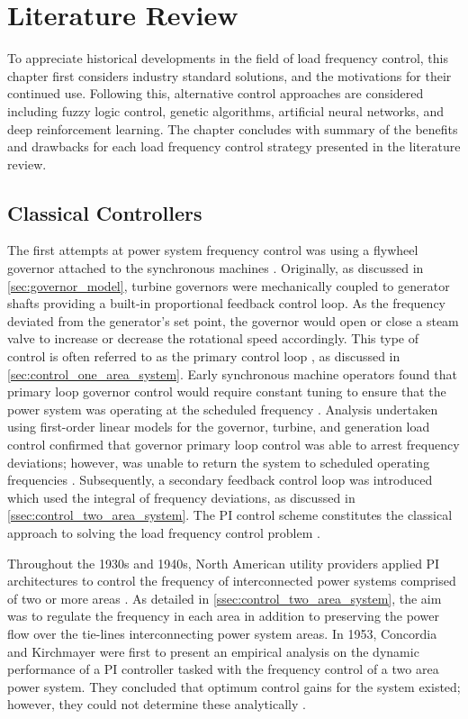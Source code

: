 \chapter{Literature Review}
To appreciate historical developments in the field of load frequency control, this chapter first considers industry standard solutions, and the motivations for their continued use. Following this, alternative control approaches are considered including fuzzy logic control, genetic algorithms, artificial neural networks, and deep reinforcement learning. The chapter concludes with summary of the benefits and drawbacks for each load frequency control strategy presented in the literature review.

\section{Classical Controllers}\label{agc}
The first attempts at power system frequency control was using a flywheel governor attached to the synchronous machines \cite{Prabhat2005}. Originally, as discussed in \textsection \ref{sec:governor_model}, turbine governors were mechanically coupled to generator shafts providing a built-in proportional feedback control loop. As the frequency deviated from the generator's set point, the governor would open or close a steam valve to increase or decrease the rotational speed accordingly. This type of control is often referred to as the primary control loop \cite{Bevrani2011}, as discussed in \textsection \ref{sec:control_one_area_system}. Early synchronous machine operators found that primary loop governor control would require constant tuning to ensure that the power system was operating at the scheduled frequency \cite{Cohn1983}. Analysis undertaken using first-order linear models for the governor, turbine, and generation load control confirmed that governor primary loop control was able to arrest frequency deviations; however, was unable to return the system to scheduled operating frequencies \cite{Saadat2011}. Subsequently, a secondary feedback control loop was introduced which used the integral of frequency deviations, as discussed in \textsection \ref{ssec:control_two_area_system}. The PI control scheme constitutes the classical approach to solving the load frequency control problem \cite{Prabhat2005}.

Throughout the 1930s and 1940s, North American utility providers applied PI architectures to control the frequency of interconnected power systems comprised of two or more areas \cite{Cohn1983}. As detailed in \textsection \ref{ssec:control_two_area_system}, the aim was to regulate the frequency in each area in addition to preserving the power flow over the tie-lines interconnecting power system areas. In 1953, Concordia and Kirchmayer were first to present an empirical analysis on the dynamic performance of a PI controller tasked with the frequency control of a two area power system. They concluded that optimum control gains for the system existed; however, they could not determine these analytically \cite{Concordia1953}.

